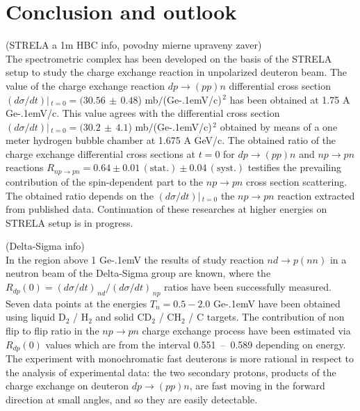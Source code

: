 \documentclass[twocolumn,epjc3]{svjour3}
\newcommand{\np}     {\ensuremath{np \rightarrow pn}\xspace}
\newcommand{\dpchex} {\ensuremath{dp \rightarrow (pp)n}\xspace}
\newcommand{\GeVc}   {Ge\kern-.1emV/c\xspace}
\newcommand{\GeV}    {Ge\kern-.1emV\xspace}
\begin{document}
\section{Conclusion and outlook}


\noindent (STRELA a 1m HBC info, povodny mierne upraveny zaver)\\
The spectrometric complex has been developed on the basis of the STRELA setup to
study the charge exchange reaction in unpolarized deuteron beam. The value of
the charge exchange reaction \dpchex differential cross section
$(d\sigma/dt)|\,_{t=0}=(30.56\,\pm\,0.48$) mb$/$(\GeVc)$^{\,2}$ has been
obtained at 1.75 A \GeVc.
This value agrees with the differential cross section
$(d\sigma/dt)|\,_{t=0}=(30.2\,\pm\,4.1$) mb$/$(\GeVc)$^{\,2}$
obtained by means of a one meter hydrogen bubble chamber at 1.675 A GeV/c.
The obtained ratio of the charge exchange differential
cross sections at $t=0$ for \dpchex and \np reactions
$R_{\np} = 0.64 \pm 0.01\,\mathrm{(stat.)} \pm 0.04\,\mathrm{(syst.)}$ testifies
the prevailing contribution of the spin-dependent part to the \np cross section
scattering. The obtained ratio depends on the $(d\sigma/dt)|\,_{t=0}$ the \np
reaction extracted from published data. Continuation of these researches at
higher energies on STRELA setup is in progress.

\vspace{0.25cm}
\noindent (Delta-Sigma info)\\
In the region above 1 \GeV the results of study reaction $nd \rightarrow p(nn)$
in a neutron beam of the Delta-Sigma group \cite{sha09,sha09_2,shi11} are known,
where the $R_{dp}(0) = (d\sigma/dt)_{\,nd} / (d\sigma/dt)_{\,np}$ ratios have
been successfully measured. Seven data points at the energies $T_n = 0.5 - 2.0$
\GeV have been obtained using liquid D$_2$ / H$_2$ and solid CD$_2$ / CH$_2$ / C
targets. The contribution of non flip to flip ratio in the \np charge exchange
process have been estimated via $R_{dp}(0)$ values which are from the interval
0.551~--~0.589 depending on energy. The experiment with monochromatic fast
deuterons is more rational in respect to the analysis of experimental data: the
two secondary protons, products of the charge exchange on deuteron \dpchex, are
fast moving in the forward direction at small angles, and so they are easily
detectable.
\end{document}
